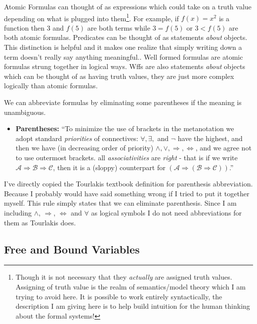 \documentclass[12pt]{article}
\newcommand{\mc}[1]{\mathcal{#1}}
\begin{document}
Atomic Formulas can thought of as expressions which could take on a truth value depending on what is plugged into them\footnote{Though it is not necessary that they \textit{actually} are assigned truth values. Assigning of truth value is the realm of semantics/model theory which I am trying to avoid here. It is possible to work entirely syntactically, the description I am giving here is to help build intuition for the human thinking about the formal systems!}. For example, if $f(x)=x^2$ is a function then $3$ and $f(5)$ are both terms while $3 = f(5)$ or $3 < f(5)$ are both atomic formulas. Predicates can be thought of as statements \textit{about} objects. This distinction is helpful and it makes one realize that simply writing down a term doesn't really say anything meaningful.. Well formed formulas are atomic formulas strung together in logical ways. Wffs are also statements \textit{about} objects which can be thought of as having truth values, they are just more complex logically than atomic formulas.

We can abbreviate formulas by eliminating some parentheses if the meaning is unambiguous.

\hrulefill
\begin{itemize}
\item{\textbf{Parentheses:} ``To minimize the use of brackets in the metanotation we adopt standard \textit{priorities} of connectives: $\forall, \exists,$ and $\lnot$ have the highest, and then we have (in decreasing order of priority) $\land, \lor, \Rightarrow, \Leftrightarrow$, and we agree not to use outermost brackets. all \textit{associativities} are \textit{right} - that is if we write $\mc{A} \Rightarrow \mc{B} \Rightarrow \mc{C}$, then it is a (sloppy) counterpart for $(\mc{A} \Rightarrow ( \mc{B} \Rightarrow \mc{C}))$.''}
\end{itemize}
\hrulefill

I've directly copied the Tourlakis textbook definition for parenthesis abbreviation. Because I probably would have said something wrong if I tried to put it together myself. This rule simply states that we can eliminate parenthesis. Since I am including $\land$, $\Rightarrow$, $\Leftrightarrow$ and $\forall$ as logical symbols I do not need abbreviations for them as Tourlakis does.

\subsection{Free and Bound Variables}
\end{document}
